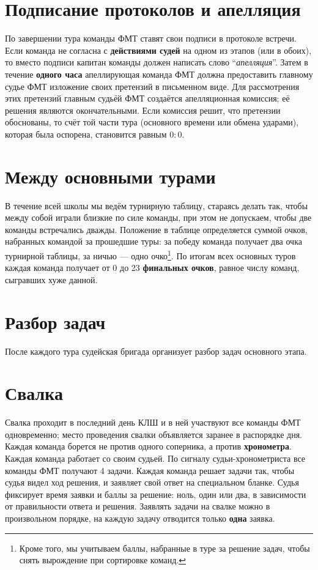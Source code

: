 \documentclass[12pt,a4paper]{article}
\begin{document}
\section{Подписание протоколов и апелляция}
По завершении тура команды ФМТ ставят свои подписи в протоколе встречи. Если команда не согласна с {\bf действиями судей} на одном из этапов (или в обоих), то вместо подписи капитан команды должен написать слово ``\textsl{апелляция}''. Затем в течение {\bf одного часа} апеллирующая команда ФМТ должна предоставить главному судье ФМТ изложение своих претензий в письменном виде. Для рассмотрения этих претензий главным судьёй ФМТ создаётся апелляционная комиссия; её решения являются окончательными. Если комиссия решит, что претензии обоснованы, то счёт той части тура (основного времени или обмена ударами), которая была оспорена, становится равным $0:0$.

\section{Между основными турами}
В течение всей школы мы ведём турнирную таблицу, стараясь делать так, чтобы между собой играли близкие по силе команды, при этом не допускаем, чтобы две команды встречались дважды. Положение в таблице определяется суммой очков, набранных командой за прошедшие туры: за победу команда получает два очка турнирной таблицы, за ничью --- одно очко\footnote{Кроме того, мы учитываем баллы, набранные в туре за решение задач, чтобы снять вырождение при сортировке команд.}. По итогам всех основных туров каждая команда получает от 0 до 23 {\bf финальных очков}, равное числу команд, сыгравших хуже данной.

\section{Разбор задач}
После каждого тура судейская бригада организует разбор задач основного этапа.

\section{Свалка}
Свалка проходит в последний день КЛШ и в ней участвуют все команды ФМТ одновременно; 
место проведения свалки объявляется заранее в распорядке дня. 
Каждая команда борется не против одного соперника, а против {\bf хронометра}.   
Каждая команда работает со своим судьей. По сигналу судьи-хронометриста все команды ФМТ получают 4 задачи. 
Каждая команда решает задачи так, чтобы судья видел ход решения, и заявляет свой ответ на специальном бланке. 
Судья фиксирует время заявки и баллы за решение: ноль, один или два, в зависимости от правильности ответа и решения. 
Заявлять задачи на свалке можно в произвольном порядке, на каждую задачу отводится только \textbf{одна} заявка.
\end{document}
